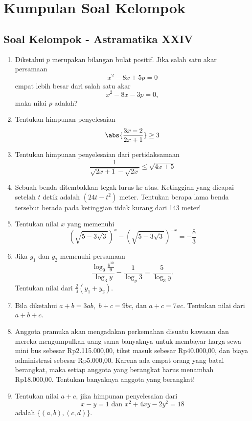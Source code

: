 \chapter{Kumpulan Soal Kelompok}
\hrulefill

\section{Soal Kelompok - Astramatika XXIV}
\begin{enumerate}
\item Diketahui $p$ merupakan bilangan bulat positif. Jika salah satu akar persamaan $$x^2-8x+5p=0$$ empat lebih besar dari salah satu akar $$x^2-8x-3p=0,$$maka nilai $p$ adalah?

\item Tentukan himpunan penyelesaian $$\abs{\frac{3x-2}{2x+1}}\geq 3$$

\item Tentukan himpunan penyelesaian dari pertidaksamaan $$\frac{1}{\sqrt{2x+1}-\sqrt{2x}} \leq \sqrt{4x+5}$$

\item Sebuah benda ditembakkan tegak lurus ke atas. Ketinggian yang dicapai setelah $t$ detik adalah $(24t-t^2)$ meter. Tentukan berapa lama benda tersebut berada pada ketinggian tidak kurang dari 143 meter!

\item Tentukan nilai $x$ yang memenuhi $$\left(\sqrt{5-3\sqrt{3}}\right)^x - \left(\sqrt{5-3\sqrt{3}}\right)^{-x} = -\frac{8}{3}$$

\item Jika $y_1$ dan $y_2$ memenuhi persamaan $$\frac{\log_9 \frac{y^{10}}{9}}{\log_3 y} - \frac{1}{\log_y 3} = \frac{5}{\log_3 y}.$$ Tentukan nilai dari $\frac{2}{3}(y_1+y_2)$.

\item Bila diketahui $a+b=3ab$,\ $b+c=9bc$, dan $a+c=7ac$. Tentukan nilai dari $a+b+c$.

\item Anggota pramuka akan mengadakan perkemahan disuatu kawasan dan mereka mengumpulkan uang sama banyaknya untuk membayar harga sewa mini bus sebesar Rp2.115.000,00, tiket masuk sebesar Rp40.000,00, dan biaya administrasi sebesar Rp5.000,00. Karena ada empat orang yang batal berangkat, maka setiap anggota yang berangkat harus menambah Rp18.000,00. Tentukan banyaknya anggota yang berangkat!

\item Tentukan nilai $a+c$, jika himpunan penyelesaian dari $$x-y=1\text{ dan }x^2+4xy-2y^2 = 18$$ adalah $\{(a,b), (c,d)\}$.


\end{enumerate}
